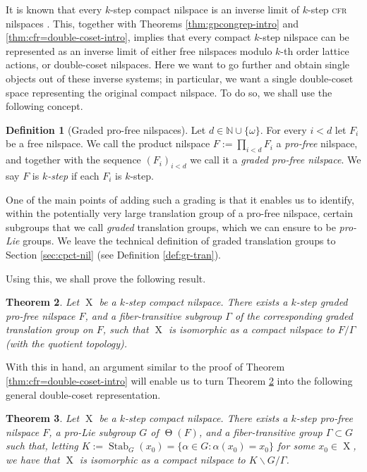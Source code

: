 \documentclass[a4paper,12pt,reqno]{amsart}
\newtheorem{theorem}{Theorem}[section]
\theoremstyle{definition}
\newtheorem{defn}[theorem]{Definition}
\def\to{\rightarrow}
\newcommand{\mb}{\mathbb}
\DeclareMathOperator{\stab}{Stab}
\DeclareMathOperator{\tran}{\Theta}
\DeclareMathOperator{\ns}{X}
\begin{document}
It is known that every $k$-step compact nilspace is an inverse limit of $k$-step \textsc{cfr} nilspaces \cite[Theorem 2.7.3]{Cand:Notes2}. This, together with Theorems \ref{thm:gpcongrep-intro} and \ref{thm:cfr=double-coset-intro}, implies that every compact $k$-step nilspace can be represented as an inverse limit of either free nilspaces modulo $k$-th order lattice actions, or double-coset nilspaces. Here we want to go further and obtain single objects out of these inverse systems; in particular, we want a single double-coset space representing the original compact nilspace. To do so, we shall use the following concept.
\begin{defn}[Graded pro-free nilspaces]\label{def:free-graded-nilspace} Let $d\in \mb{N}\cup\{\omega\}$.
For every $i< d$ let $F_i$ be a free nilspace. We call the product nilspace $F:=\prod_{i<d} F_i$ a \emph{pro-free} nilspace, and together with the sequence $(F_i)_{i< d}$ we call it a \emph{graded pro-free nilspace}. We say $F$ is \emph{$k$-step} if each  $F_i$ is $k$-step. %
\end{defn}
\noindent One of the main points of adding such a grading is that it enables us to identify, within the potentially very large translation group of a pro-free nilspace, certain subgroups that we call \emph{graded} translation groups, which we can ensure to be \emph{pro-Lie} groups. We leave the technical definition of graded translation groups to Section \ref{sec:cpct-nil} (see Definition \ref{def:gr-tran}).

Using this, we shall prove the following result.
\begin{theorem}\label{thm:cpct-as-quo-of-free-inf}
Let $\ns$ be a $k$-step compact nilspace. There exists a $k$-step graded pro-free nilspace $F$, and a fiber-transitive subgroup $\Gamma$ of the corresponding graded translation group on $F$, such that $\ns$ is isomorphic as a compact nilspace to $F/\Gamma$ \textup{(}with the quotient topology\textup{)}.
\end{theorem}
\noindent With this in hand, an argument similar to the proof of Theorem \ref{thm:cfr=double-coset-intro} will enable us to turn Theorem \ref{thm:cpct-as-quo-of-free-inf} into the following general double-coset representation.
\begin{theorem}\label{thm:cpct-nil-as-dou-coset}
Let $\ns$ be a $k$-step compact nilspace. There exists a $k$-step pro-free nilspace $F$, a pro-Lie subgroup $G$ of $\tran(F)$, and a fiber-transitive group $\Gamma\subset G$ such that, letting $K:=\stab_G(x_0)=\{\alpha\in G:\alpha(x_0)=x_0\}$ for some $x_0\in \ns$, we have that $\ns$ is isomorphic as a compact nilspace to $K\backslash G/\Gamma$.
\end{theorem}
\end{document}
